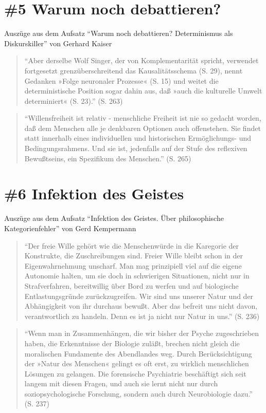 \documentclass[
  a4paper,
]{report}
\begin{document}
\hypertarget{def-ev5}{%
\section{\#5 Warum noch debattieren?}\label{def-ev5}}

Auszüge aus dem Aufsatz ``Warum noch debattieren? Determinismus als Diskurskiller'' von Gerhard Kaiser \citeyearpar{Kaiser2004}

\begin{quote}
``Aber derselbe Wolf Singer, der von Komplementarität spricht, verwendet fortgesetzt grenzüberschreitend das Kausalitätsschema (S. 29), nennt Gedanken »Folge neuronaler Prozesse« (S. 15) und weitet die deterministische Position sogar dahin aus, daß »auch die kulturelle Umwelt determiniert« (S. 23).'' (S. 263)
\end{quote}

\begin{quote}
``Willensfreiheit ist relativ - menschliche Freiheit ist nie so gedacht worden, daß dem Menschen alle je denkbaren Optionen auch offenstehen. Sie findet statt innerhalb eines individuellen und historischen Ermöglichungs- und Bedingungsrahmens. Und sie ist, jedenfalls auf der Stufe des reflexiven Bewußtseins, ein Spezifikum des Menschen.'' (S. 265)
\end{quote}

\hypertarget{def-ev6}{%
\section{\#6 Infektion des Geistes}\label{def-ev6}}

Auszüge aus dem Aufsatz ``Infektion des Geistes. Über philosophische Kategorienfehler'' von Gerd Kempermann \citeyearpar{Kempermann2004}

\begin{quote}
``Der freie Wille gehört wie die Menschenwürde in die Karegorie der Konstrukte, die Zuschreibungen sind. Freier Wille bleibt schon in der Eigenwahrnehmung unscharf. Man mag prinzipiell viel auf die eigene Autonomie halten, um sie doch in schwierigen Situationen, nicht nur in Strafverfahren, bereitwillig über Bord zu werfen und auf biologische Entlastungsgründe zurückzugreifen. Wir sind uns unserer Natur und der Abhängigkeit von ihr durchaus bewußt. Aber das befreit uns nicht davon, verantwortlich zu handeln. Denn es ist ja nicht nur Natur in uns.'' (S. 236)
\end{quote}

\begin{quote}
``Wenn man in Zusammenhängen, die wir bisher der Psyche zugeschrieben haben, die Erkenntnisse der Biologie zuläßt, brechen nicht gleich die moralischen Fundamente des Abendlandes weg. Durch Berücksichtigung der »Natur des Menschen« gelingt es oft erst, zu wirklich menschlichen Lösungen zu gelangen. Die forensische Psychiatrie beschäftigt sich seit langem mit diesen Fragen, und auch sie lernt nicht nur durch soziopsychologische Forschung, sondern auch durch Neurobiologie dazu.'' (S. 237)
\end{quote}
\end{document}
